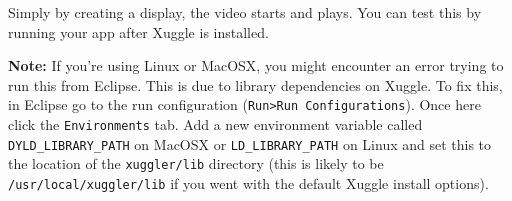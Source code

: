 Simply by creating a display, the video starts and plays. You can test this by running 
your app after Xuggle is installed. 

\textbf{Note:} If you're using Linux or MacOSX, you might encounter an error trying to run this from Eclipse. 
This is due to library dependencies on Xuggle. To fix this, in Eclipse go to the run configuration 
(\verb+Run>Run Configurations+). Once here click the \verb+Environments+ tab. Add a new environment 
variable called \verb+DYLD_LIBRARY_PATH+ on MacOSX or \verb+LD_LIBRARY_PATH+ on Linux and set this to 
the location of the \verb+xuggler/lib+ directory (this is likely to be \verb+/usr/local/xuggler/lib+
if you went with the default Xuggle install options).

